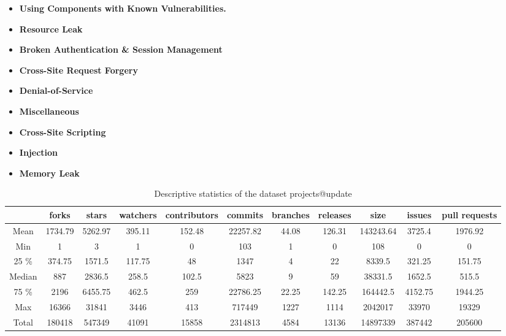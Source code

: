 \documentclass[10pt,conference]{IEEEtran}
\begin{document}
\begin{itemize}
	\item \textbf{Using Components with Known Vulnerabilities.}
	\item \textbf{Resource Leak}
	\item \textbf{Broken Authentication \& Session Management}
	\item \textbf{Cross-Site Request Forgery}
	\item \textbf{Denial-of-Service}
	\item \textbf{Miscellaneous}
	\item \textbf{Cross-Site Scripting}
	\item \textbf{Injection}
	\item \textbf{Memory Leak}
\end{itemize}


\begin{table}[h]
\centering
\caption{Descriptive statistics of the dataset projects\textcolor{mypink3}{@update}} \label{tab:dataset}
\begin{tabular}{@{}ccccccccccc@{}}
\toprule
     & forks   & stars   & watchers & contributors & commits  & branches & releases & size      & issues  & pull requests \\ \midrule
Mean & 1734.79 & 5262.97 & 395.11   & 152.48       & 22257.82 & 44.08    & 126.31   & 143243.64 & 3725.4  & 1976.92       \\
Min     & 1       & 3       & 1        & 0            & 103      & 1        & 0        & 108       & 0       & 0             \\
25 \%     & 374.75  & 1571.5  & 117.75   & 48           & 1347     & 4        & 22       & 8339.5    & 321.25  & 151.75        \\
Median     & 887     & 2836.5  & 258.5    & 102.5        & 5823     & 9        & 59       & 38331.5   & 1652.5  & 515.5         \\
75 \%     & 2196    & 6455.75 & 462.5    & 259          & 22786.25 & 22.25    & 142.25   & 164442.5  & 4152.75 & 1944.25       \\
Max     & 16366   & 31841   & 3446     & 413          & 717449   & 1227     & 1114     & 2042017   & 33970   & 19329         \\
Total     & 180418  & 547349  & 41091    & 15858        & 2314813  & 4584     & 13136    & 14897339  & 387442  & 205600        \\ \bottomrule
\end{tabular}
\end{table}
\end{document}
